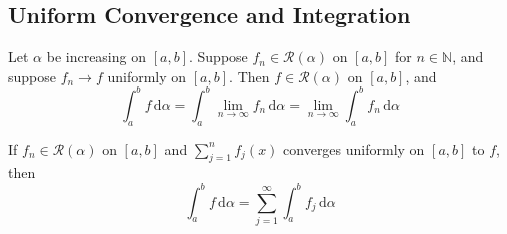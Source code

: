 \subsection{Uniform Convergence and Integration}
\begin{theorem}
    Let  $ \alpha $ be increasing on  $ [a,b] $. Suppose  $ f_n\in \mathscr{R}(\alpha)  $ on  $ [a,b ] $ for  $ n\in \mathbb{N } $,
    and suppose  $ f_n\to f  $ uniformly on  $ [a,b ] $. Then  $ f\in \mathscr{R}(\alpha)      $ on  $ [a,b ] $, and
    \[\int_{a }^{b } f \, \mathrm{d}\alpha=\int_{a }^{b } \lim\limits_{n\to\infty } f_n  \, \mathrm{d}\alpha=\lim\limits_{n\to\infty} \int_{a }^{b } f_n \, \mathrm{d}\alpha     \] 

\end{theorem}
\begin{corollary}
    If  $ f_n\in \mathscr{R}(\alpha)  $ on  $ [a,b]  $ and  $ \sum\limits_{j=1 }^{n } f_j(x ) $ converges uniformly on  $ [a,b] $ to  $ f  $,
    then 
    \[\int_{a }^{b } f \, \mathrm{d}\alpha =\sum\limits_{j=1 }^{\infty} \int_{a }^{b } f_j \, \mathrm{d}\alpha \]  
\end{corollary}
